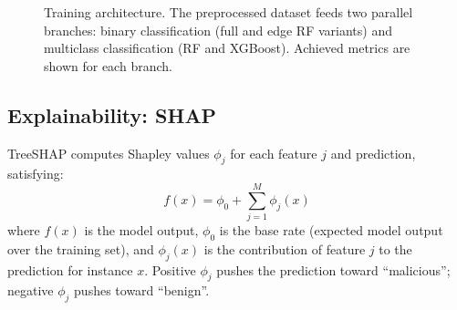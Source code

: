 \documentclass[12pt,a4paper]{article}
\begin{document}
\begin{figure}[h!]
{}
\caption{Training architecture. The preprocessed dataset feeds two parallel branches:
binary classification (full and edge RF variants) and multiclass classification
(RF and XGBoost). Achieved metrics are shown for each branch.}
\label{fig:arch_training}
\end{figure}

\subsection{Explainability: SHAP}

TreeSHAP \cite{lundberg2017shap} computes Shapley values $\phi_j$ for each
feature $j$ and prediction, satisfying:
\[
  f(x) = \phi_0 + \sum_{j=1}^{M} \phi_j(x)
\]
where $f(x)$ is the model output, $\phi_0$ is the base rate (expected model output
over the training set), and $\phi_j(x)$ is the contribution of feature $j$ to the
prediction for instance $x$. Positive $\phi_j$ pushes the prediction toward
``malicious''; negative $\phi_j$ pushes toward ``benign''.
\end{document}
